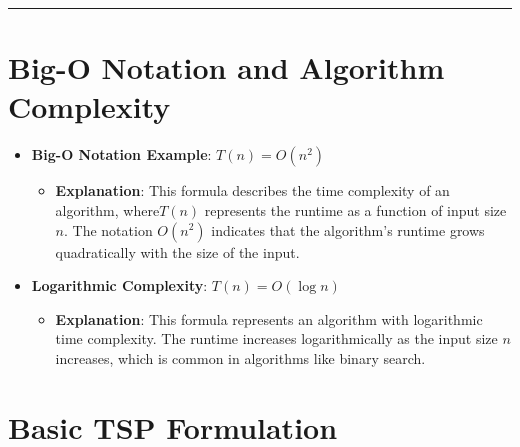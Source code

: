 \documentclass[
  letterpaper,
  DIV=11,
  numbers=noendperiod]{scrreprt}
\providecommand{\tightlist}{%
  \setlength{\itemsep}{0pt}\setlength{\parskip}{0pt}}\usepackage{longtable,booktabs,array}
\begin{document}
\begin{center}\rule{0.5\linewidth}{0.5pt}\end{center}

\section{Big-O Notation and Algorithm
Complexity}\label{big-o-notation-and-algorithm-complexity}

\begin{itemize}
\item
  \textbf{Big-O Notation Example}: \(T(n) = O(n^2)\)

  \begin{itemize}
  \tightlist
  \item
    \textbf{Explanation}: This formula describes the time complexity of
    an algorithm, where\(T(n)\) represents the runtime as a function of
    input size \(n\). The notation \(O(n^2)\) indicates that the
    algorithm's runtime grows quadratically with the size of the input.
  \end{itemize}
\item
  \textbf{Logarithmic Complexity}: \(T(n) = O(\log n)\)

  \begin{itemize}
  \tightlist
  \item
    \textbf{Explanation}: This formula represents an algorithm with
    logarithmic time complexity. The runtime increases logarithmically
    as the input size \(n\) increases, which is common in algorithms
    like binary search.
  \end{itemize}
\end{itemize}

\section{Basic TSP Formulation}\label{basic-tsp-formulation}
\end{document}
